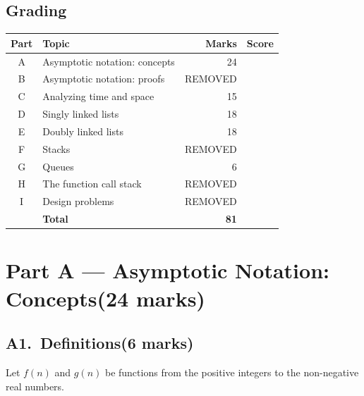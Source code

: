 \documentclass[11pt]{article}
\newcommand{\score}[1]{{\unskip\nobreak\hfil\penalty50
  \hskip2em\hbox{}\nobreak\hfil\mbox{[\hspace{2.5em}/\,#1\,]}%
  \parfillskip=0pt \finalhyphendemerits=0 \par}}
\newcommand{\partheading}[4][12\baselineskip]{\needspace{#1}%
  \section*{Part #2 --- #3\hfill{\normalsize\normalfont(#4 marks)}}}
\newcommand{\question}[4][8\baselineskip]{\needspace{#1}%
  \subsection*{#2.\ #3\hfill{\normalsize\normalfont(#4 marks)}}}
\begin{document}
\subsection*{Grading}
\begin{center}
\renewcommand{\arraystretch}{1.4}
\begin{tabular}{|c|l|r|C{2.8cm}|}
  \hline
  \textbf{Part} & \textbf{Topic} & \textbf{Marks} & \textbf{Score} \\ \hline
  A & Asymptotic notation: concepts & 24 & \\ \hline
  B & Asymptotic notation: proofs   & REMOVED & \\ \hline
  C & Analyzing time and space      & 15 & \\ \hline
  D & Singly linked lists           & 18 & \\ \hline
  E & Doubly linked lists           & 18 & \\ \hline
  F & Stacks                        & REMOVED & \\ \hline
  G & Queues                        &  6 & \\ \hline
  H & The function call stack       &  REMOVED & \\ \hline
  I & Design problems               &  REMOVED & \\ \hline
    & \textbf{Total}                & \textbf{81} & \\ \hline
\end{tabular}
\end{center}

\clearpage

\partheading{A}{Asymptotic Notation: Concepts}{24}

\question{A1}{Definitions}{6}
Let $f(n)$ and $g(n)$ be functions from the positive integers to the
non-negative real numbers.
\end{document}
